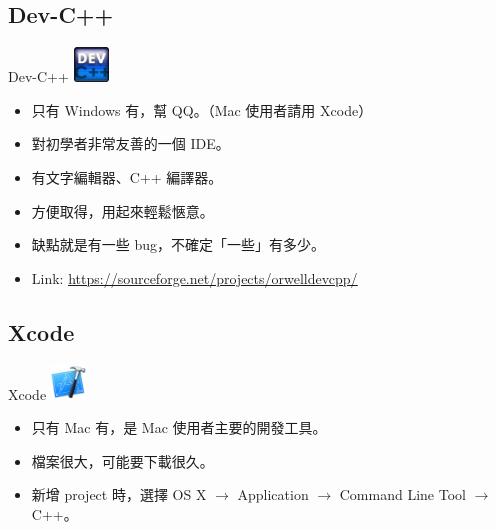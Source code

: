 \documentclass[t]{beamer}
\begin{document}
\subsection{Dev-C++}
\begin{frame}{Dev-C++}
  \vspace{0.5em}
  \hspace{2em}
  \includegraphics[height=2.5em]{image/dev.png}
  \vspace{0.5em}
  \begin{itemize}
    \item 只有 Windows 有，幫 QQ。（Mac 使用者請用 Xcode）
    \item 對初學者非常友善的一個 IDE。
    \item 有文字編輯器、C++ 編譯器。
    \item 方便取得，用起來輕鬆愜意。
    \item 缺點就是有一些 bug，不確定「一些」有多少。
    \item Link: \href{https://sourceforge.net/projects/orwelldevcpp/}{\underline{https://sourceforge.net/projects/orwelldevcpp/}}
  \end{itemize}
\end{frame}

\subsection{Xcode}
\begin{frame}{Xcode}
  \vspace{0.5em}
  \hspace{2em}
  \includegraphics[height=2.5em]{image/xcode.png}
  \vspace{0.5em}
  \begin{itemize}
    \item 只有 Mac 有，是 Mac 使用者主要的開發工具。
    \item 檔案很大，可能要下載很久。
    \item 新增 project 時，選擇 OS X $\to$ Application $\to$ Command Line Tool $\to$ C++。
  \end{itemize}
\end{frame}

\end{document}
